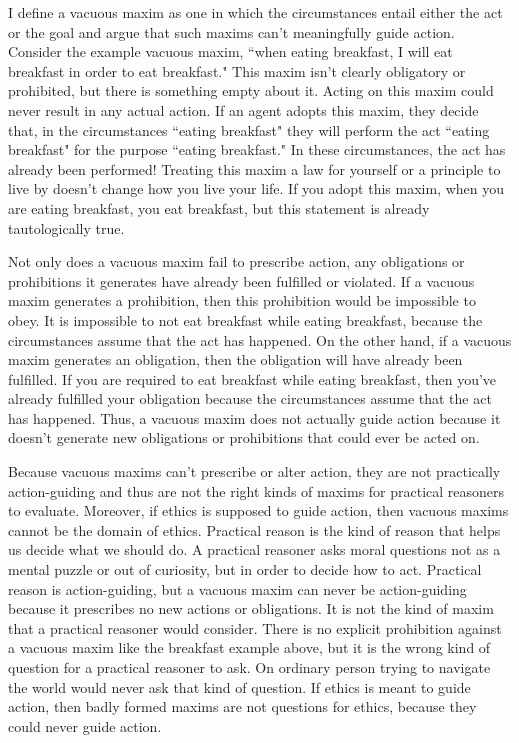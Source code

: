 \begin{isabellebody}
\begin{isamarkuptext}
I define a vacuous maxim as one in which the circumstances entail either the act or the goal and argue 
that such maxims can't meaningfully guide action. Consider the example vacuous maxim, ``when eating 
breakfast, I will eat breakfast in order to eat breakfast." This 
maxim isn't clearly obligatory or prohibited, but there is something empty about it. Acting on this
 maxim could never result in any actual action. If an agent adopts this maxim, 
they decide that, in the circumstances ``eating breakfast" they will perform the act ``eating breakfast"
for the purpose ``eating breakfast." In these circumstances, the act has 
already been performed! Treating this maxim a law for yourself or a principle to live by doesn't change 
how you live your life. If you adopt this maxim, when you are eating breakfast, you eat breakfast, 
but this statement is already tautologically true. 

Not only does a vacuous maxim fail to prescribe action, any obligations or prohibitions it 
generates have already been fulfilled or violated. If a vacuous 
maxim generates a prohibition, then this prohibition would be impossible to obey. 
It is impossible to not eat breakfast while eating breakfast, because the circumstances assume that the 
act has happened. On the other hand, if a vacuous maxim generates an obligation, then the obligation 
will have already been fulfilled. If you are required to eat breakfast while eating breakfast, then you've 
already fulfilled your obligation because the circumstances assume that the act has happened. Thus, 
a vacuous maxim does not actually guide action because it doesn't generate new obligations or 
prohibitions that could ever be acted on. 

Because vacuous maxims can't prescribe or alter action, they are not practically action-guiding and 
thus are not the right kinds of maxims for practical reasoners to evaluate. Moreover, if ethics 
is supposed to guide action, then vacuous maxims cannot be the domain of ethics. Practical reason
is the kind of reason that helps us decide what we should do. 
A practical reasoner asks moral questions not as a mental puzzle or out of curiosity, but 
in order to decide how to act. Practical reason is action-guiding, but a vacuous
 maxim can never be action-guiding because it prescribes no new
actions or obligations. It is not the kind of maxim that a practical reasoner would consider. 
There is no explicit prohibition against a vacuous maxim like the breakfast example above, but it 
is the wrong kind of question for a practical reasoner to ask. On ordinary person trying 
to navigate the world would never ask that kind of question. If ethics is meant 
to guide action, then badly formed maxims are not questions for ethics, because they could never guide 
action.


\end{isamarkuptext}
\end{isabellebody}
